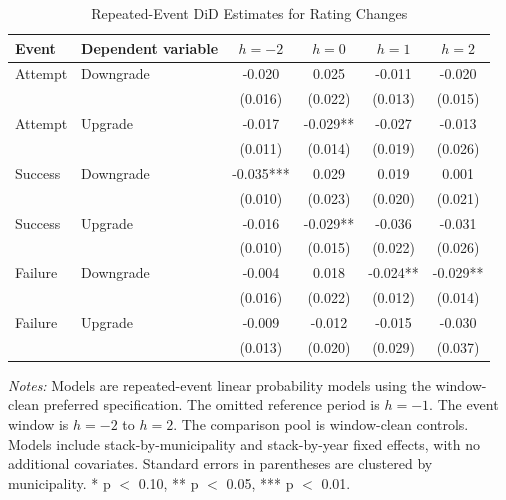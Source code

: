 \begin{table}[!htbp]
\centering
\caption{Repeated-Event DiD Estimates for Rating Changes}
\label{tab:northeast_did_main}
\footnotesize
\begin{tabular}{llcccc}
\toprule
Event & Dependent variable & $h=-2$ & $h=0$ & $h=1$ & $h=2$ \\
\midrule
Attempt & Downgrade & -0.020 & 0.025 & -0.011 & -0.020 \\
 &  & (0.016) & (0.022) & (0.013) & (0.015) \\
Attempt & Upgrade & -0.017 & -0.029** & -0.027 & -0.013 \\
 &  & (0.011) & (0.014) & (0.019) & (0.026) \\
Success & Downgrade & -0.035*** & 0.029 & 0.019 & 0.001 \\
 &  & (0.010) & (0.023) & (0.020) & (0.021) \\
Success & Upgrade & -0.016 & -0.029** & -0.036 & -0.031 \\
 &  & (0.010) & (0.015) & (0.022) & (0.026) \\
Failure & Downgrade & -0.004 & 0.018 & -0.024** & -0.029** \\
 &  & (0.016) & (0.022) & (0.012) & (0.014) \\
Failure & Upgrade & -0.009 & -0.012 & -0.015 & -0.030 \\
 &  & (0.013) & (0.020) & (0.029) & (0.037) \\
\bottomrule
\end{tabular}
\vspace{0.05in}
\begin{minipage}{0.96\textwidth}\footnotesize\emph{Notes:} Models are repeated-event linear probability models using the window-clean preferred specification. The omitted reference period is $h=-1$. The event window is $h=-2$ to $h=2$. The comparison pool is window-clean controls. Models include stack-by-municipality and stack-by-year fixed effects, with no additional covariates. Standard errors in parentheses are clustered by municipality. * p $<$ 0.10, ** p $<$ 0.05, *** p $<$ 0.01.\end{minipage}
\end{table}
